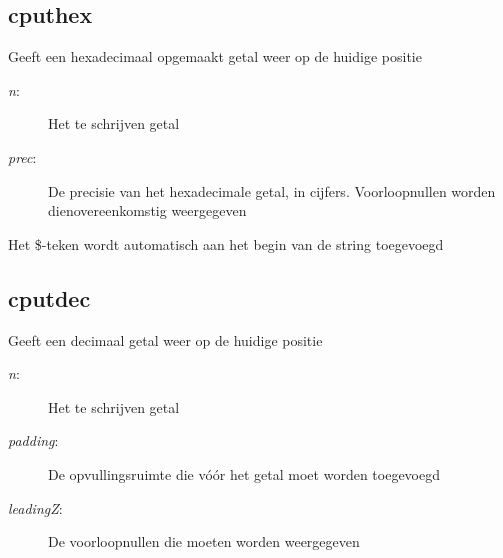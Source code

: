 \subsection{cputhex}
\begin{description}[leftmargin=2.4cm,style=nextline]
\item [Beschrijving:] {Geeft een hexadecimaal opgemaakt getal weer op de huidige positie}\item [Syntaxis:] \item [Parameters:]
\begin{description}
\item [{\em n}:] {Het te schrijven getal}\item [{\em prec}:] {De precisie van het hexadecimale getal, in cijfers. Voorloopnullen   worden dienovereenkomstig weergegeven}
\end{description}
\item [Opmerkingen:] {Het \$-teken wordt automatisch   aan het begin van de string toegevoegd}
\end{description}

\subsection{cputdec}
\begin{description}[leftmargin=2.4cm,style=nextline]
\item [Beschrijving:] {Geeft een decimaal getal weer op de huidige positie}\item [Syntaxis:] \item [Parameters:]
\begin{description}
\item [{\em n}:] {Het te schrijven getal}\item [{\em padding}:] {De opvullingsruimte die vóór het getal moet worden toegevoegd}\item [{\em leadingZ}:] {De   voorloopnullen die moeten worden weergegeven}
\end{description}
\end{description}


